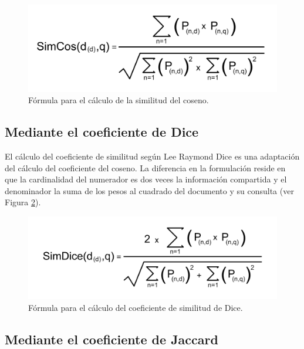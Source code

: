 \documentclass[titlepage]{article}
\begin{document}
\begin{figure}[h]
	\begin{center}
		\includegraphics*[scale=0.5]{similitud_coseno_formula.png}
	\end{center}
	\caption{Fórmula para el cálculo de la similitud del coseno.}
	\label{fig: Figure 3}
\end{figure}

\subsection{Mediante el coeficiente de Dice}

El cálculo del coeficiente de similitud según Lee Raymond Dice es una adaptación del cálculo del coeficiente del coseno. La diferencia en la formulación reside en que la cardinalidad del numerador es dos veces la información compartida y el denominador la suma de los pesos al cuadrado del documento y su consulta (ver Figura \ref{fig: Figure 4}). 

\begin{figure}[h]
	\begin{center}
		\includegraphics*[scale=0.5]{similitud_dice.png}
	\end{center}
	\caption{Fórmula para el cálculo del coeficiente de similitud de Dice.}
	\label{fig: Figure 4}
\end{figure}

\subsection{Mediante el coeficiente de Jaccard}
\end{document}
